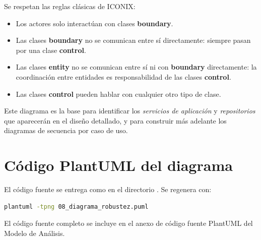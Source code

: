 Se respetan las reglas clásicas de ICONIX:

\begin{itemize}
  \item Los actores solo interactúan con clases \textbf{boundary}.
  \item Las clases \textbf{boundary} no se comunican entre sí directamente: siempre pasan por una clase \textbf{control}.
  \item Las clases \textbf{entity} no se comunican entre sí ni con \textbf{boundary} directamente: la coordinación entre entidades es responsabilidad de las clases \textbf{control}.
  \item Las clases \textbf{control} pueden hablar con cualquier otro tipo de clase.
\end{itemize}

Este diagrama es la base para identificar los \textit{servicios de aplicación} y \textit{repositorios} que aparecerán en el diseño detallado, y para construir más adelante los diagramas de secuencia por caso de uso.

\section{Código PlantUML del diagrama}

El código fuente se entrega como  en el directorio . Se regenera con:

\begin{lstlisting}[language=bash]
plantuml -tpng 08_diagrama_robustez.puml
\end{lstlisting}

El código fuente completo se incluye en el anexo de código fuente PlantUML del Modelo de Análisis.
